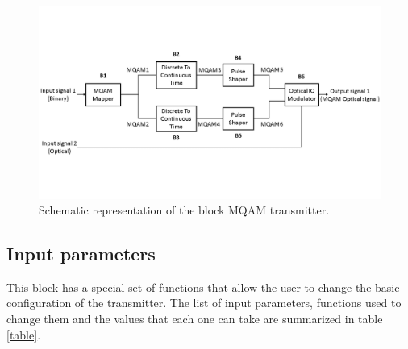 \begin{figure}[h]
	\centering
	\includegraphics[width=\textwidth]{./lib/m_qam_transmitter/figures/MQAM_transmitter_block_diagram}
	\caption{Schematic representation of the block MQAM transmitter.}\label{MQAM_transmitter_block_diagram}
\end{figure}

\subsection*{Input parameters}

This block has a special set of functions that allow the user to change the basic configuration of the transmitter. The list of input parameters, functions used to change them and the values that each one can take are summarized in table \ref{table}.

